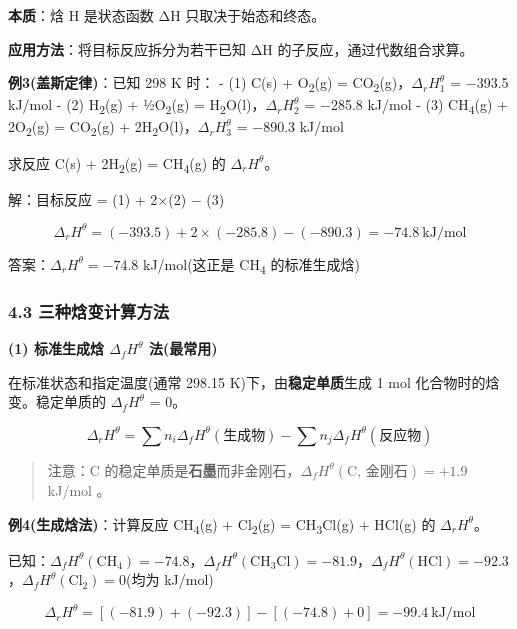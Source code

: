 \textbf{本质}：焓 H 是状态函数 \箭 ΔH 只取决于始态和终态。

\textbf{应用方法}：将目标反应拆分为若干已知 ΔH 的子反应，通过代数组合求算。

\textbf{例3(盖斯定律)}：已知 298 K 时：
- (1) C(s) + O\textsubscript{2}(g) = CO\textsubscript{2}(g)，\(\Delta_r H_1^\theta\) = −393.5 kJ/mol
- (2) H\textsubscript{2}(g) + ½O\textsubscript{2}(g) = H\textsubscript{2}O(l)，\(\Delta_r H_2^\theta\) = −285.8 kJ/mol
- (3) CH\textsubscript{4}(g) + 2O\textsubscript{2}(g) = CO\textsubscript{2}(g) + 2H\textsubscript{2}O(l)，\(\Delta_r H_3^\theta\) = −890.3 kJ/mol

求反应 C(s) + 2H\textsubscript{2}(g) = CH\textsubscript{4}(g) 的 \(\Delta_r H^\theta\)。

解：目标反应 = (1) + 2×(2) − (3)

\[\Delta_r H^\theta = (-393.5) + 2 \times (-285.8) - (-890.3) = -74.8\ \mathrm{kJ/mol}\]

答案：\(\Delta_r H^\theta = -74.8\) kJ/mol(这正是 CH\textsubscript{4} 的标准生成焓)

\subsubsection{4.3 三种焓变计算方法}\label{ux4e09ux79cdux7113ux53d8ux8ba1ux7b97ux65b9ux6cd5}

\textbf{(1) 标准生成焓 \(\Delta_f H^\theta\) 法(最常用)}

在标准状态和指定温度(通常 298.15 K)下，由\textbf{稳定单质}生成 1 mol 化合物时的焓变。稳定单质的 \(\Delta_f H^\theta\) = 0。

\[
\boxed{\Delta_r H^\theta = \sum n_i \Delta_f H^\theta(\text{生成物}) - \sum n_j \Delta_f H^\theta(\text{反应物})}
\]

\begin{quote}
注意：C 的稳定单质是\textbf{石墨}而非金刚石，\(\Delta_f H^\theta(\text{C, 金刚石}) = +1.9\) kJ/mol 。
\end{quote}

\textbf{例4(生成焓法)}：计算反应 CH\textsubscript{4}(g) + Cl\textsubscript{2}(g) = CH\textsubscript{3}Cl(g) + HCl(g) 的 \(\Delta_r H^\theta\)。

已知：\(\Delta_f H^\theta(\text{CH}_4) = -74.8\)，\(\Delta_f H^\theta(\text{CH}_3\text{Cl}) = -81.9\)，\(\Delta_f H^\theta(\text{HCl}) = -92.3\)，\(\Delta_f H^\theta(\text{Cl}_2) = 0\)(均为 kJ/mol)

\[\Delta_r H^\theta = [(-81.9) + (-92.3)] - [(-74.8) + 0] = -99.4\ \mathrm{kJ/mol}\]

